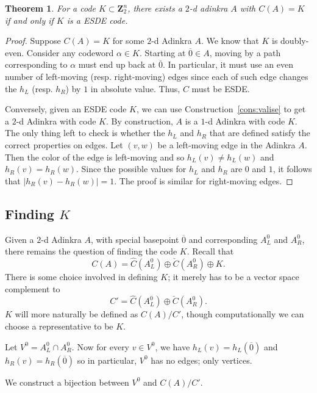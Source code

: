 \documentclass[12pt,twoside,singlespace]{article}
\numberwithin{equation}{section}
\newtheorem{thm}[equation]{Theorem}
\theoremstyle{definition}
\newcommand{\ZZ}{\mathbf{Z}}
\begin{document}
\begin{thm}
\label{thm:esde}
For a code $K \subset \ZZ_2^n$, there exists a $2$-d adinkra $A$ with $C(A) = K$ if and only if $K$ is a ESDE code.
\end{thm}
\begin{proof}
Suppose $C(A) = K$ for some $2$-d Adinkra $A$. We know that $K$ is doubly-even. Consider any codeword $\alpha \in K$. Starting at $\overline{0} \in A$, moving by a path corresponding to $\alpha$ must end up back at $\overline{0}$. In particular, it must use an even number of left-moving (resp. right-moving) edges since each of such edge changes the $h_L$ (resp. $h_R$) by $1$ in absolute value. Thus, $C$ must be ESDE. 

Conversely, given an ESDE code $K$, we can use Construction~\ref{cons:valise} to get a $2$-d Adinkra with code $K$. By construction, $A$ is a $1$-d Adinkra with code $K$.  The only thing left to check is whether the $h_L$ and $h_R$ that are defined satisfy the correct properties on edges. Let $(v,w)$ be a left-moving edge in the Adinkra $A$.  Then the color of the edge is left-moving and so $h_L(v)\not=h_L(w)$ and $h_R(v)=h_R(w)$.  Since the possible values for $h_L$ and $h_R$ are $0$ and $1$, it follows that $|h_R(v)-h_R(w)|=1$. The proof is similar for right-moving edges.

\end{proof}


\subsection{Finding $K$}
Given a $2$-d Adinkra $A$, with special basepoint $\overline{0}$ and corresponding $A_L^0$ and $A_R^0$, there remains the question of finding the code $K$.  Recall that
\[C(A)=\hat{C}(A_L^0)\oplus\check{C}(A_R^0)\oplus K.\]
There is some choice involved in defining $K$; it merely has to be a vector space complement to
\[C'=\hat{C}(A_L^0)\oplus\check{C}(A_R^0).\]
$K$ will more naturally be defined as $C(A)/C'$, though computationally we can choose a representative to be $K$.


Let $V^0=A_L^0\cap A_R^0$.  Now for every $v\in V^0$, we have $h_L(v)=h_L(\overline{0})$ and $h_R(v)=h_R(\overline{0})$ so in particular, $V^0$ has no edges; only vertices.

We construct a bijection between $V^0$ and $C(A)/C'$.
\end{document}
